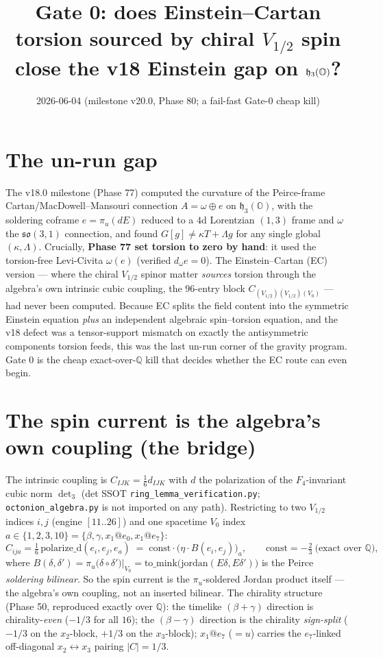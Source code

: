 \documentclass[11pt]{article}
\title{Gate 0: does Einstein--Cartan torsion sourced by chiral $V_{1/2}$ spin
close the v18 Einstein gap on $\h_3(\Oo)$?}
\date{2026-06-04 \quad (milestone v20.0, Phase 80; a fail-fast Gate-0 cheap kill)}
\newcommand{\h}{\mathfrak{h}}
\newcommand{\so}{\mathfrak{so}}
\newcommand{\Oo}{\mathbb{O}}
\begin{document}
\maketitle

\section{The un-run gap}

The v18.0 milestone (Phase 77) computed the curvature of the Peirce-frame
Cartan/MacDowell--Mansouri connection $A=\omega\oplus e$ on $\h_3(\Oo)$, with the
soldering coframe $e=\pi_u(dE)$ reduced to a $4$d Lorentzian $(1,3)$ frame and
$\omega$ the $\so(3,1)$ connection, and found $G[g]\neq\kappa T+\Lambda g$ for any
single global $(\kappa,\Lambda)$. Crucially, \textbf{Phase 77 set torsion to zero
by hand}: it used the torsion-free Levi-Civita $\omega(e)$ (verified $d_\omega e=0$).
The Einstein--Cartan (EC) version --- where the chiral $V_{1/2}$ spinor matter
\emph{sources} torsion through the algebra's own intrinsic cubic coupling, the
$96$-entry block $C_{(V_{1/2})(V_{1/2})(V_0)}$ --- had never been computed. Because EC
splits the field content into the symmetric Einstein equation \emph{plus} an
independent algebraic spin--torsion equation, and the v18 defect was a
tensor-support mismatch on exactly the antisymmetric components torsion feeds, this
was the last un-run corner of the gravity program. Gate 0 is the cheap
exact-over-$\mathbb{Q}$ kill that decides whether the EC route can even begin.

\section{The spin current is the algebra's own coupling (the bridge)}

The intrinsic coupling is $C_{IJK}=\tfrac16 d_{IJK}$ with $d$ the polarization of the
$F_4$-invariant cubic norm $\det_3$ (det SSOT \texttt{ring\_lemma\_verification.py};
\texttt{octonion\_algebra.py} is not imported on any path). Restricting to two
$V_{1/2}$ indices $i,j$ (engine $[11..26]$) and one spacetime $V_0$ index
$a\in\{1,2,3,10\}=\{\beta,\gamma,x_1@e_0,x_1@e_7\}$:
\begin{equation}
C_{ija}=\tfrac16\,\mathrm{polarize\_d}(e_i,e_j,e_a)
   \;=\; \mathrm{const}\cdot\big(\eta\cdot B(e_i,e_j)\big)_a,
   \qquad \mathrm{const}=-\tfrac23 \ \text{(exact over }\mathbb{Q}),
\end{equation}
where $B(\delta,\delta')=\pi_u\!\big(\delta\circ\delta'\big)\big|_{V_0}
= \mathrm{to\_mink}\big(\mathrm{jordan}(E\delta,E\delta')\big)$ is the Peirce
\emph{soldering bilinear}. So the spin current is the $\pi_u$-soldered Jordan product
itself --- the algebra's own coupling, not an inserted bilinear. The chirality
structure (Phase 50, reproduced exactly over $\mathbb{Q}$): the timelike
$(\beta{+}\gamma)$ direction is chirality-\emph{even} ($-1/3$ for all $16$); the
$(\beta{-}\gamma)$ direction is the chirality \emph{sign-split} ($-1/3$ on the
$x_2$-block, $+1/3$ on the $x_3$-block); $x_1@e_7$ ($=u$) carries the $e_7$-linked
off-diagonal $x_2\!\leftrightarrow\! x_3$ pairing $|C|=1/3$.
\end{document}
